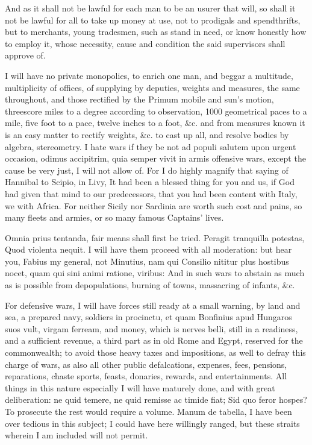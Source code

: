 {And as it shall not be lawful for each man to be an usurer that
will, so shall it not be lawful for all to take up money at use, not to
prodigals and spendthrifts, but to merchants, young tradesmen, such as
stand in need, or know honestly how to employ it, whose necessity,
cause and condition the said supervisors shall approve of.

I will have no private monopolies, to enrich one man, and beggar a
multitude, multiplicity of offices, of supplying by deputies,
weights and measures, the same throughout, and those rectified by the
Primum mobile and sun's motion, threescore miles to a degree according
to observation, 1000 geometrical paces to a mile, five foot to a pace,
twelve inches to a foot, \&c. and from measures known it is an easy
matter to rectify weights, \&c. to cast up all, and resolve bodies by
algebra, stereometry. I hate wars if they be not ad populi salutem upon
urgent occasion, odimus accipitrim, quia semper vivit in armis
 offensive wars, except the cause be very just, I will not allow
of. For I do highly magnify that saying of Hannibal to Scipio, in
Livy, It had been a blessed thing for you and us, if God had given
that mind to our predecessors, that you had been content with Italy, we
with Africa. For neither Sicily nor Sardinia are worth such cost and
pains, so many fleets and armies, or so many famous Captains' lives.

Omnia prius tentanda, fair means shall first be tried. Peragit
tranquilla potestas, Quod violenta nequit. I will have them proceed
with all moderation: but hear you, Fabius my general, not Minutius, nam
qui Consilio nititur plus hostibus nocet, quam qui sini animi
ratione, viribus: And in such wars to abstain as much as is possible
from depopulations, burning of towns, massacring of infants, \&c.

For defensive wars, I will have forces still ready at a small warning,
by land and sea, a prepared navy, soldiers in procinctu, et quam
Bonfinius apud Hungaros suos vult, virgam ferream, and money,
which is nerves belli, still in a readiness, and a sufficient revenue,
a third part as in old Rome and Egypt, reserved for the
commonwealth; to avoid those heavy taxes and impositions, as well to
defray this charge of wars, as also all other public defalcations,
expenses, fees, pensions, reparations, chaste sports, feasts, donaries,
rewards, and entertainments. All things in this nature especially I
will have maturely done, and with great deliberation: ne quid
 temere, ne quid remisse ac timide fiat; Sid quo feror hospes? To
prosecute the rest would require a volume. Manum de tabella, I have
been over tedious in this subject; I could have here willingly ranged,
but these straits wherein I am included will not permit.

}
